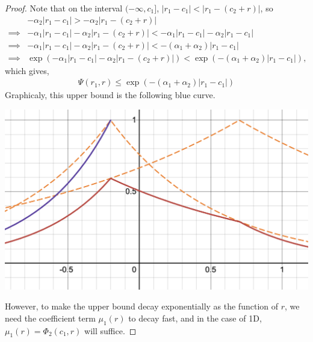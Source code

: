 \documentclass[12pt]{article}
\begin{document}
\begin{proof}
Note that on the interval \((-\infty,c_1]\), \(   |r_1 - c_1| < |r_1 - (c_2+r)|\), so
\begin{align*} 
    & -\alpha_2 |r_1-c_1| > -\alpha_2|r_1-(c_2+r)|\\
    \implies & -\alpha_1|r_1-c_1| - \alpha_2|r_1-(c_2+r)| < -\alpha_1|r_1-c_1| - \alpha_2|r_1-c_1|\\
    \implies & -\alpha_1|r_1-c_1| - \alpha_2|r_1-(c_2+r)| < -(\alpha_1 + \alpha_2)|r_1 - c_1|\\
    \implies & \exp(-\alpha_1|r_1-c_1| - \alpha_2|r_1-(c_2+r)|) < \exp(-(\alpha_1 + \alpha_2)|r_1 - c_1|),
\end{align*}
which gives,
\begin{align*}
    \boxed{\Psi(r_1, r) \leq \exp(-(\alpha_1 + \alpha_2)|r_1-c_1|)} \tag{\(\ast\ast\)}
\end{align*}
Graphicaly, this upper bound is the following blue curve.
\begin{center}
    \includegraphics[scale=0.5]{figure2.png}
\end{center}
However, to make the upper bound decay exponentially as the function of \(r\), we need the coefficient term \(\mu_1(r)\) to decay fast, and in the case of 1D, \(\mu_1(r) = \Phi_2(c_1,r)\) will suffice.


\end{proof}
\end{document}
